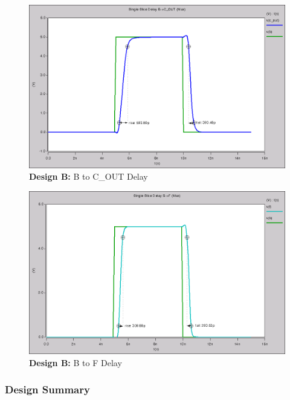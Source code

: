 \documentclass{article}
\begin{document}


\begin{figure}[H]
    \centering
    \includegraphics[width=\linewidth]{../part_3/max/max_single_slice_b_to_cout.png}
    \caption{\textbf{Design B:} B to C\_OUT Delay}
\end{figure}

\begin{figure}[H]
    \centering
    \includegraphics[width=\linewidth]{../part_3/max/max_single_slice_b_to_f.png}
    \caption{\textbf{Design B:} B to F Delay}
\end{figure}

\vspace{0.5in}
\subsubsection*{Design Summary}
\end{document}

